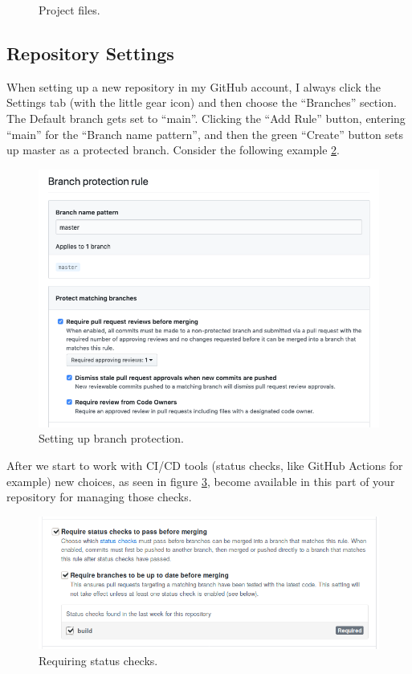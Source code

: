 \begin{figure}[!htb]
\centering

\caption{Project files.}
\label{projfiles}
\end{figure}


\subsection{Repository Settings}

\justifying
When setting up a new repository in my GitHub account, I always click the Settings tab (with the little gear icon) and then choose the
``Branches'' section. The Default branch gets set to ``main''. Clicking the ``Add Rule'' button, entering ``main'' for the ``Branch name pattern'',
and then the green ``Create'' button sets up master as a protected branch. Consider the following example \ref{branchprotect}.

\begin{figure}[!htb]
\centering
\includegraphics[scale=0.50]{images/github-branch-protection.png}
\caption{Setting up branch protection.}
\label{branchprotect}
\end{figure}

\justifying
After we start to work with CI/CD tools (status checks, like GitHub Actions for example) new choices, as seen in figure \ref{statuscheck}, become
available in this part of your repository for managing those checks.

\begin{figure}
\centering
\includegraphics[scale=0.53]{images/guthub-status-check.png}
\caption{Requiring status checks.}
\label{statuscheck}
\end{figure}

